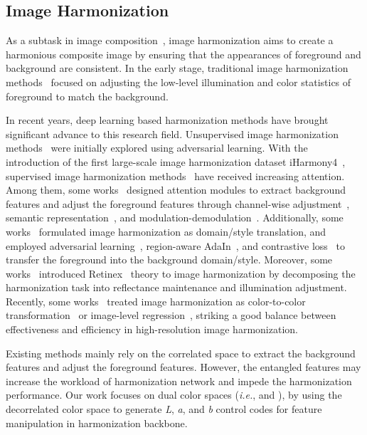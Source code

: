 \documentclass[sigconf]{acmart}
\begin{document}
\subsection{Image Harmonization}
As a subtask in image composition~\cite{niu2021making}, image harmonization aims to create a harmonious composite image by ensuring that the appearances of foreground and background are consistent. 
In the early stage, traditional image harmonization methods~\cite{lalonde2007using} focused on adjusting the low-level illumination and color statistics of foreground to match the background.

In recent years, deep learning based harmonization methods have brought significant advance to this research field. 
Unsupervised image harmonization methods~\cite{zhu2015learning} were initially explored using adversarial learning.
With the introduction of the first large-scale image harmonization dataset iHarmony4~\cite{dovenet}, supervised image harmonization methods~\cite{charmnet, Scs-co, S2CRNet, ssh, xing2022composite,peng2022frih,bao2022deep,zhu2022image,chen2023dense,chen2022hierarchical, PHDNet, ren2022semantic} have received increasing attention. 
Among them, some works~\cite{ssam, issam, feature_mod} designed attention modules to extract background features and adjust the foreground features through channel-wise adjustment~\cite{ssam}, semantic representation~\cite{issam, dih}, and modulation-demodulation~\cite{feature_mod}.
Additionally, some works~\cite{dovenet, rainnet, bargainnet} formulated image harmonization as domain/style translation, and employed adversarial learning~\cite{dovenet}, region-aware AdaIn~\cite{rainnet}, and contrastive loss~\cite{bargainnet} to transfer the foreground into the background domain/style. 
Moreover, some works~\cite{intrinsic, IHT, HT} introduced Retinex~\cite{land1971lightness} theory to image harmonization by decomposing the harmonization task into reflectance maintenance and illumination adjustment. 
Recently, some works~\cite{harmonizer, CDTNet} treated image harmonization as color-to-color transformation~\cite{CDTNet} or image-level regression~\cite{harmonizer}, striking a good balance between effectiveness and efficiency in high-resolution image harmonization.

Existing methods mainly rely on the correlated  space to extract the background features and adjust the foreground features. However, the entangled  features may increase the workload of harmonization network and impede the harmonization performance.
Our work focuses on dual color spaces (\emph{i.e.},  and ), by using the decorrelated  color space to generate \textit{L}, \textit{a}, and \textit{b} control codes for feature manipulation in harmonization backbone. 
\end{document}
